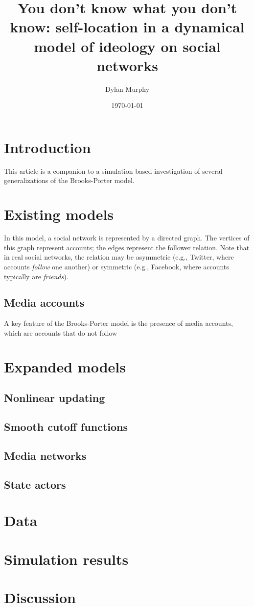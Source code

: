 \documentclass[10pt]{amsart}
\title{You don't know what you don't know: self-location in a dynamical model of ideology on social networks}
\author{Dylan Murphy}
\date{\today}
\begin{document}
\maketitle

\begin{abstract}

\end{abstract}

\section{Introduction}



This article is a companion to a simulation-based investigation of several generalizations of the Brooks-Porter model.

\section{Existing models}



In this model, a social network is represented by a directed graph.
The vertices of this graph represent accounts; the edges represent the follower relation.
Note that in real social networks, the relation may be asymmetric (e.g., Twitter, where accounts \emph{follow} one another) or symmetric (e.g., Facebook, where accounts typically are \emph{friends}).

\subsection{Media accounts}

A key feature of the Brooks-Porter model is the presence of media accounts, which are accounts that do not follow 

\section{Expanded models}

\subsection{Nonlinear updating}

\subsection{Smooth cutoff functions}

\subsection{Media networks}

\subsection{State actors}

\section{Data}

\section{Simulation results}

\section{Discussion}
\end{document}
